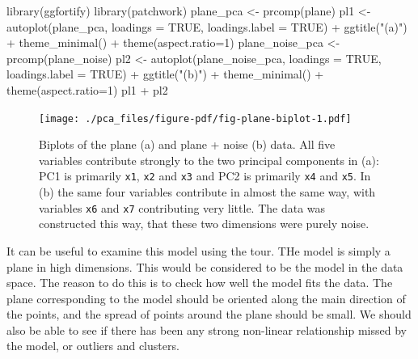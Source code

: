 \documentclass[
  letterpaper,
]{book}
\newenvironment{Shaded}{\begin{snugshade}}{\end{snugshade}}
\newcommand{\AttributeTok}[1]{\textcolor[rgb]{0.40,0.45,0.13}{#1}}
\newcommand{\ConstantTok}[1]{\textcolor[rgb]{0.56,0.35,0.01}{#1}}
\newcommand{\DecValTok}[1]{\textcolor[rgb]{0.68,0.00,0.00}{#1}}
\newcommand{\FunctionTok}[1]{\textcolor[rgb]{0.28,0.35,0.67}{#1}}
\newcommand{\NormalTok}[1]{\textcolor[rgb]{0.00,0.23,0.31}{#1}}
\newcommand{\OtherTok}[1]{\textcolor[rgb]{0.00,0.23,0.31}{#1}}
\newcommand{\SpecialCharTok}[1]{\textcolor[rgb]{0.37,0.37,0.37}{#1}}
\newcommand{\StringTok}[1]{\textcolor[rgb]{0.13,0.47,0.30}{#1}}
\begin{document}
\begin{Shaded}
\begin{Highlighting}[]
\FunctionTok{library}\NormalTok{(ggfortify)}
\FunctionTok{library}\NormalTok{(patchwork)}
\NormalTok{plane\_pca }\OtherTok{\textless{}{-}} \FunctionTok{prcomp}\NormalTok{(plane)}
\NormalTok{pl1 }\OtherTok{\textless{}{-}} \FunctionTok{autoplot}\NormalTok{(plane\_pca, }\AttributeTok{loadings =} \ConstantTok{TRUE}\NormalTok{, }
         \AttributeTok{loadings.label =} \ConstantTok{TRUE}\NormalTok{) }\SpecialCharTok{+} 
  \FunctionTok{ggtitle}\NormalTok{(}\StringTok{"(a)"}\NormalTok{) }\SpecialCharTok{+}
  \FunctionTok{theme\_minimal}\NormalTok{() }\SpecialCharTok{+} 
  \FunctionTok{theme}\NormalTok{(}\AttributeTok{aspect.ratio=}\DecValTok{1}\NormalTok{)}
\NormalTok{plane\_noise\_pca }\OtherTok{\textless{}{-}} \FunctionTok{prcomp}\NormalTok{(plane\_noise)}
\NormalTok{pl2 }\OtherTok{\textless{}{-}} \FunctionTok{autoplot}\NormalTok{(plane\_noise\_pca, }\AttributeTok{loadings =} \ConstantTok{TRUE}\NormalTok{, }
         \AttributeTok{loadings.label =} \ConstantTok{TRUE}\NormalTok{) }\SpecialCharTok{+} 
  \FunctionTok{ggtitle}\NormalTok{(}\StringTok{"(b)"}\NormalTok{) }\SpecialCharTok{+}
  \FunctionTok{theme\_minimal}\NormalTok{() }\SpecialCharTok{+} 
  \FunctionTok{theme}\NormalTok{(}\AttributeTok{aspect.ratio=}\DecValTok{1}\NormalTok{)}
\NormalTok{pl1 }\SpecialCharTok{+}\NormalTok{ pl2}
\end{Highlighting}
\end{Shaded}

\begin{figure}[H]

{\centering \texttt{[image: ./pca\_files/figure-pdf/fig-plane-biplot-1.pdf]}

}

\caption{\label{fig-plane-biplot}Biplots of the plane (a) and plane +
noise (b) data. All five variables contribute strongly to the two
principal components in (a): PC1 is primarily \texttt{x1}, \texttt{x2}
and \texttt{x3} and PC2 is primarily \texttt{x4} and \texttt{x5}. In (b)
the same four variables contribute in almost the same way, with
variables \texttt{x6} and \texttt{x7} contributing very little. The data
was constructed this way, that these two dimensions were purely noise.}

\end{figure}

It can be useful to examine this model using the tour. THe model is
simply a plane in high dimensions. This would be considered to be the
model in the data space. The reason to do this is to check how well the
model fits the data. The plane corresponding to the model should be
oriented along the main direction of the points, and the spread of
points around the plane should be small. We should also be able to see
if there has been any strong non-linear relationship missed by the
model, or outliers and clusters.
\end{document}
